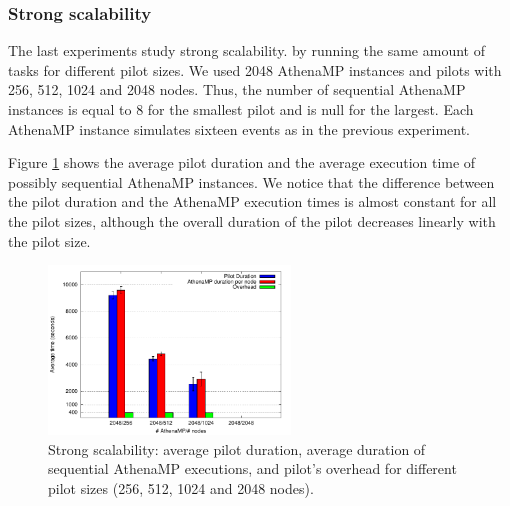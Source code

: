 \subsubsection{Strong scalability}

The last experiments %
study strong scalability. %
by running the same amount of tasks for different pilot sizes. We used
2048 AthenaMP instances and %
pilots with 256, 512, 1024 and 2048 nodes. Thus, the number of sequential
AthenaMP instances is equal to 8 for the smallest pilot and is null for the
largest. Each AthenaMP instance
simulates sixteen events as in the previous experiment.

Figure \ref{fig:strongScala} %
shows the average pilot duration and the average execution time of possibly
sequential AthenaMP instances.  We %
notice that the difference between the pilot duration and the AthenaMP execution
times is almost constant for all the pilot sizes, although the overall duration
of the pilot decreases linearly with the pilot size.

\begin{figure}[!htb]
        \includegraphics[height=4.5cm,width=\columnwidth]{./figures/NGE/strong.pdf}
    \caption{Strong scalability:  average pilot duration, average duration of
    sequential AthenaMP executions, and pilot's overhead for different pilot
    sizes (256, 512, 1024 and 2048 nodes).}
\label{fig:strongScala}
\end{figure}

%

